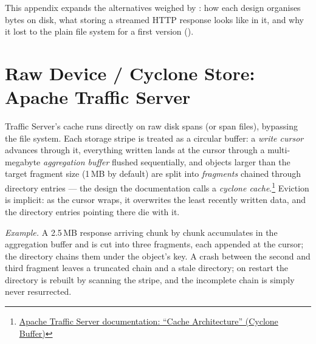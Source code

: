%

This appendix expands the alternatives weighed by
: how each design organises bytes on
disk, what storing a streamed HTTP response looks like in it, and why it
lost to the plain file system for a first version
().

\section{Raw Device / Cyclone Store: Apache Traffic Server}
\label{app:alt-ats}

Traffic Server's cache runs directly on raw disk spans (or span files),
bypassing the file system. Each storage stripe is treated as a circular
buffer: a \emph{write cursor} advances through it, everything written
lands at the cursor through a multi-megabyte \emph{aggregation buffer}
flushed sequentially, and objects larger than the target fragment size
(1\,MB by default) are split into \emph{fragments} chained through
directory entries --- the design the documentation calls a \emph{cyclone
cache}.\footnote{\href{https://docs.trafficserver.apache.org/en/latest/developer-guide/cache-architecture/architecture.en.html\#cyclone-buffer}{Apache Traffic Server documentation: ``Cache Architecture'' (Cyclone Buffer)}}
Eviction is implicit: as the cursor wraps, it overwrites the
least recently written data, and the directory entries pointing there die
with it.

\emph{Example.} A 2.5\,MB response arriving chunk by chunk accumulates in
the aggregation buffer and is cut into three fragments, each appended at
the cursor; the directory chains them under the object's key. A crash
between the second and third fragment leaves a truncated chain and a
stale directory; on restart the directory is rebuilt by scanning the
stripe, and the incomplete chain is simply never resurrected.


